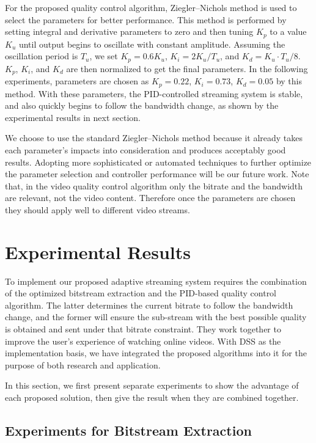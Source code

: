 \documentclass[journal]{IEEEtran}
\begin{document}
For the proposed quality control algorithm, Ziegler--Nichols method \cite{Ziegler42} is used to select the parameters for better performance. This method is performed by setting integral and derivative parameters to zero and then tuning $K_p$ to a value $K_u$ until output begins to oscillate with constant amplitude. Assuming the oscillation period is $T_u$, we set $K_p = 0.6K_u$, $K_i = 2K_u/T_u$, and $K_d = K_u \cdot T_u/8$. $K_p$, $K_i$, and $K_d$ are then normalized to get the final parameters. In the following experiments, parameters are chosen as $K_p = 0.22$, $K_i = 0.73$, $K_d = 0.05$ by this method. With these parameters, the PID-controlled streaming system is stable, and also quickly begins to follow the bandwidth change, as shown by the experimental results in next section.

We choose to use the standard Ziegler--Nichols method because it already takes each parameter's impacts into consideration and produces acceptably good results. Adopting more sophisticated or automated techniques to further optimize the parameter selection and controller performance will be our future work. Note that, in the video quality control algorithm only the bitrate and the bandwidth are relevant, not the video content. Therefore once the parameters are chosen they should apply well to different video streams.


\section{Experimental Results}
\label{sec:experiment}

To implement our proposed adaptive streaming system requires the combination of the optimized bitstream extraction and the PID-based quality control algorithm. The latter determines the current bitrate to follow the bandwidth change, and the former will ensure the sub-stream with the best possible quality is obtained and sent under that bitrate constraint. They work together to improve the user's experience of watching online videos. With DSS as the implementation basis, we have integrated the proposed algorithms into it for the purpose of both research and application.

In this section, we first present separate experiments to show the advantage of each proposed solution, then give the result when they are combined together.

\subsection{Experiments for Bitstream Extraction}
\label{subsec:exp-extraction}
\end{document}
